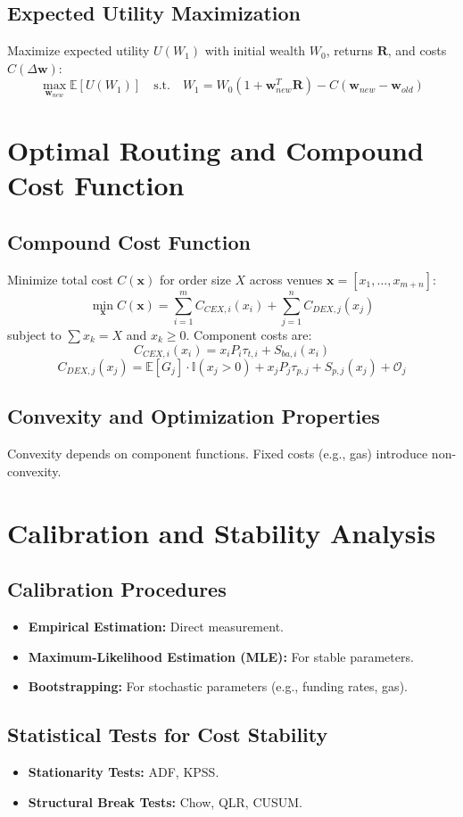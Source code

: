 \documentclass{article}
\begin{document}
\subsection{Expected Utility Maximization}
Maximize expected utility $U(W_1)$ with initial wealth $W_0$, returns $\mathbf{R}$, and costs $C(\Delta \mathbf{w})$:
$$ \max_{\mathbf{w}_{new}} \mathbb{E}[U(W_1)] \quad \text{s.t.} \quad W_1 = W_0 (1 + \mathbf{w}_{new}^T \mathbf{R}) - C(\mathbf{w}_{new} - \mathbf{w}_{old}) $$

\section{Optimal Routing and Compound Cost Function}

\subsection{Compound Cost Function}
Minimize total cost $C(\mathbf{x})$ for order size $X$ across venues $\mathbf{x} = [x_1, \dots, x_{m+n}]$:
$$ \min_{\mathbf{x}} C(\mathbf{x}) = \sum_{i=1}^{m} C_{CEX,i}(x_i) + \sum_{j=1}^{n} C_{DEX,j}(x_j) $$
subject to $\sum x_k = X$ and $x_k \ge 0$.  Component costs are:
$$C_{CEX,i}(x_i) = x_i P_i \tau_{t,i} + S_{ba,i}(x_i)$$
$$ C_{DEX,j}(x_j) = \mathbb{E}[G_j] \cdot \mathbb{I}(x_j > 0) + x_j P_j \tau_{p,j} + S_{p,j}(x_j) + \mathcal{O}_j $$

\subsection{Convexity and Optimization Properties}
Convexity depends on component functions. Fixed costs (e.g., gas) introduce non-convexity.

\section{Calibration and Stability Analysis}

\subsection{Calibration Procedures}
\begin{itemize}
    \item \textbf{Empirical Estimation:} Direct measurement.
    \item \textbf{Maximum-Likelihood Estimation (MLE):} For stable parameters.
    \item \textbf{Bootstrapping:} For stochastic parameters (e.g., funding rates, gas).
\end{itemize}

\subsection{Statistical Tests for Cost Stability}
\begin{itemize}
    \item \textbf{Stationarity Tests:} ADF, KPSS.
    \item \textbf{Structural Break Tests:} Chow, QLR, CUSUM.
\end{itemize}
\end{document}
